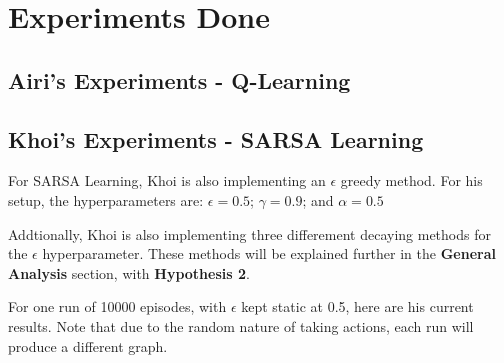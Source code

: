 \section{Experiments Done}

\subsection{Airi's Experiments - Q-Learning}






\subsection{Khoi's Experiments - SARSA Learning}
For SARSA Learning, Khoi is also implementing an $\epsilon$ greedy method. For his setup, the hyperparameters are: $\epsilon = 0.5$; $\gamma = 0.9$; and $\alpha = 0.5$

Addtionally, Khoi is also implementing three differement decaying methods for the $\epsilon$ hyperparameter. These methods will be explained further in the \textbf{General Analysis} section, with \textbf{Hypothesis 2}.

For one run of 10000 episodes, with $\epsilon$ kept static at 0.5, here are his current results. Note that due to the random nature of taking actions, each run will produce a different graph.

